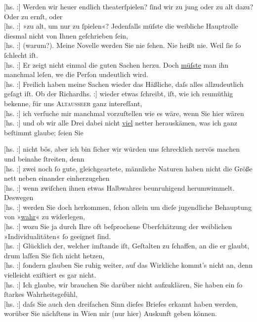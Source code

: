 \pstart
           {[}hs. :{]} Werden wir heuer endlich theaterſpielen? { }ſind wir zu jung oder zu alt dazu? Oder zu ernſt, oder {\\}{[}hs. :{]} »zu alt, um nur zu ſpielen«? Jedenfalls müſste die
               weibliche Hauptrolle diesmal nicht von Ihnen geſchrieben ſein, {\\}{[}hs. :{]} (warum?). Meine Novelle werden Sie nie ſehen. Nie heißt nie. Weil ſie ſo ſchlecht iſt. {\\}{[}hs. :{]} Er zeigt nicht einmal die guten Sachen herzu. Doch \uline{müſste} man ihn manchmal leſen, we{\geminationn} die Perſon undeutlich wird. {\\}{[}hs. :{]} Freilich haben meine Sachen wieder das Häßliche, daſs
               alles allzudeutlich geſagt iſt. Ob der Richard\pwindex{Beer-Hofmann, Richard 1866-07-11 – 1945-09-26@\textsc{Beer-Hofmann, Richard} (1866-07-11 – 1945-09-26), \emph{Schriftsteller/Schriftstellerin}|pw}{\\}{[}hs. :{]} wieder etwas ſchreibt, iſt, wie ich reumüthig bekenne,
               für uns \textsc{Altausseer} ganz intereſſant, {\\}{[}hs. :{]} ich verſuche mir manchmal vor\introOben{}zu\introOben{}ſtellen wie es wäre, wenn Sie hier wären {\\}{[}hs. :{]} und ob wir alle Drei dabei nicht \uline{viel} netter herauskämen, was ich ganz beſtimmt glaube; ſeien
               Sie \pend
           
\pstart
           {\pb}{[}hs. :{]} nicht bös, aber ich bin ſicher wir würden uns { }ſchrecklich nervös machen und beinahe ſtreiten, denn {\\}{[}hs. :{]} zwei noch ſo gute, gleichgeartete, männliche Naturen
               haben nicht die Größe nett neben einander einherzugehen {\\}{[}hs. :{]} wenn zwiſchen ihnen etwas Halbwahres beunruhigend
               herumwimmelt. Deswegen {\\}{[}hs. :{]} werden Sie doch herkommen, ſchon allein um dieſe jugendliche Behauptung von »\uline{wahr}« zu widerlegen, {\\}{[}hs. :{]} wozu Sie ja durch Ihre oft beſprochene Überſchätzung
               der weiblichen »Individualitäten« ſo geeignet ſind. {\\}{[}hs. :{]} Glücklich der, welcher imſtande iſt, Geſtalten zu
               ſchaffen, an die er glaubt, drum laſſen Sie ſich nicht hetzen, {\\}{[}hs. :{]} ſondern glauben Sie ruhig weiter, auf das Wirkliche
               kommt’s nicht an, denn vielleicht exiſtiert es gar nicht. {\\}{[}hs. :{]} Ich glaube, wir brauchen Sie darüber nicht
               aufzuklären, Sie haben ein ſo ſtarkes Wahrheitsgefühl, {\\}{[}hs. :{]} daſs Sie auch den dreifachen Sinn dieſes Briefes
               erkannt haben werden, worüber Sie nächſtens in Wien mir (nur hier) Auskunft geben können.\pend
           
